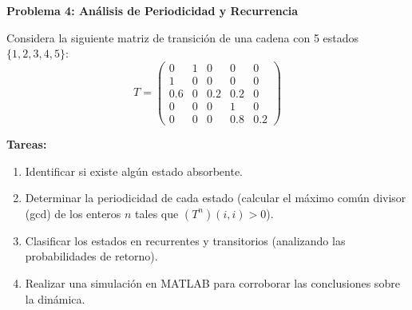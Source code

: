 \documentclass{article}
\begin{document}

\begin{problem}
\textbf{Problema 4: Análisis de Periodicidad y Recurrencia}

Considera la siguiente matriz de transición de una cadena con 5 estados \(\{1,2,3,4,5\}\):
\[
T = \begin{pmatrix}
0   & 1   & 0   & 0   & 0 \\
1   & 0   & 0   & 0   & 0 \\
0.6 & 0   & 0.2 & 0.2 & 0 \\
0   & 0   & 0   & 1   & 0 \\
0   & 0   & 0   & 0.8 & 0.2 
\end{pmatrix}
\]

\textbf{Tareas:}
\begin{enumerate}
    \item Identificar si existe algún estado absorbente.
    \item Determinar la periodicidad de cada estado (calcular el máximo común divisor (gcd) de los enteros \(n\) tales que \((T^n)(i,i) > 0\)).
    \item Clasificar los estados en recurrentes y transitorios (analizando las probabilidades de retorno).
    \item Realizar una simulación en MATLAB para corroborar las conclusiones sobre la dinámica.
\end{enumerate}
\end{problem}
\end{document}
